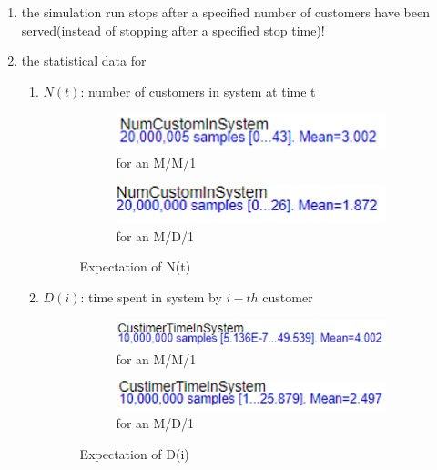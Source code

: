 \documentclass{homework}
\begin{document}
\begin{enumerate}[label=(\alph*)]
	\item the simulation run stops after a specified number of customers have been served(instead of stopping after a specified stop time)!
	\item the statistical data for
	\begin{enumerate}[label=(\roman*)]
		\item $N(t)$: number of customers in system at time t
		\begin{figure}[hbt!]
		     \centering
		     \begin{subfigure}[hbt!]{0.4\textwidth}
			\centering
			\includegraphics[width=\textwidth]{N_MM1.png}
			\caption{for an M/M/1}
		     \end{subfigure}
		     \hfill
		     \begin{subfigure}[hbt!]{0.4\textwidth}
		         \centering
		         \includegraphics[width=\textwidth]{N_MD1.png}
		         \caption{for an M/D/1}
		     \end{subfigure}
		        \caption{Expectation of N(t)}
		\end{figure}
		\item $D(i)$: time spent in system by $i-th$ customer
		\begin{figure}[hbt!]
		     \centering
		     \begin{subfigure}[hbt!]{0.4\textwidth}
			\centering
			\includegraphics[width=\textwidth]{D_MM1.png}
			\caption{for an M/M/1}
		     \end{subfigure}
		     \hfill
		     \begin{subfigure}[hbt!]{0.4\textwidth}
		         \centering
		         \includegraphics[width=\textwidth]{D_MD1.png}
		         \caption{for an M/D/1}
		     \end{subfigure}
		        \caption{Expectation of D(i)}
		\end{figure}


\end{enumerate}
\end{enumerate}
\end{document}
